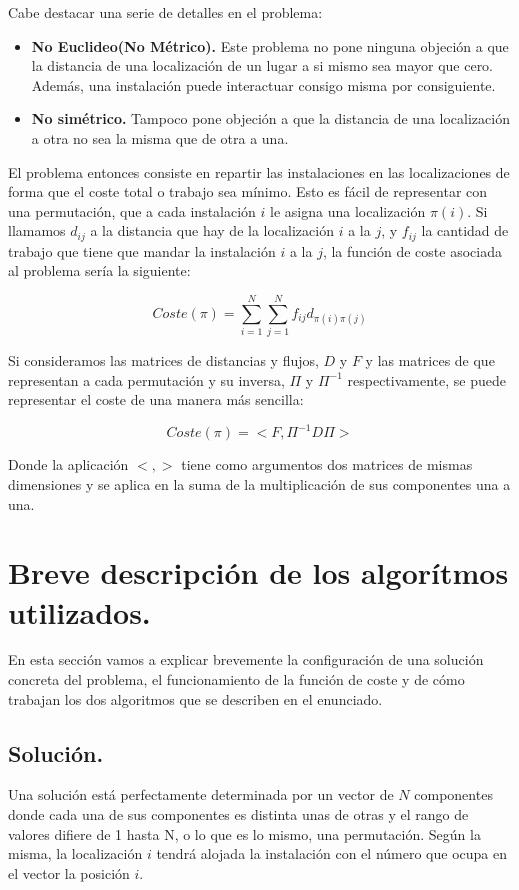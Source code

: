 Cabe destacar una serie de detalles en el problema:

\begin{itemize}
	\item \textbf{No Euclideo(No Métrico).} Este problema  no pone ninguna objeción a que la distancia de una localización de un lugar a si mismo sea mayor que cero. Además, una instalación puede interactuar consigo misma por consiguiente.
	\item \textbf{No simétrico.} Tampoco pone objeción a que la distancia de una localización a otra no sea la misma que de otra a una.
\end{itemize}

El problema entonces consiste en repartir las instalaciones en las localizaciones de forma que el coste total o trabajo sea mínimo. Esto es fácil de representar con una permutación, que a cada instalación $i$ le asigna una localización $\pi(i)$. Si llamamos $d_{ij}$ a la distancia que hay de la localización $i$ a la $j$, y $f_{ij}$ la cantidad de trabajo que tiene que mandar la instalación $i$ a la $j$, la función de coste asociada al problema sería la siguiente:

\[Coste(\pi)=\sum_{i=1}^{N}\sum_{j=1}^{N}f_{ij}d_{\pi(i)\pi(j)}\]

Si consideramos las matrices de distancias y flujos, $D$ y $F$ y las matrices de que representan a cada permutación y su inversa, $\Pi$ y $\Pi^{-1}$ respectivamente, se puede representar el coste de una manera más sencilla:

\[Coste(\pi)=<F,\Pi^{-1}D\Pi> \]

Donde la aplicación $<,>$ tiene como argumentos dos matrices de mismas dimensiones y se aplica en la suma de la multiplicación de sus componentes una a una. 

\newpage

\section{Breve descripción de los algorítmos utilizados.}
En esta sección vamos a explicar brevemente la configuración de una solución concreta del problema, el funcionamiento de la función de coste y de cómo trabajan los dos algoritmos que se describen en el enunciado.

\subsection{Solución.}

Una solución está perfectamente determinada por un vector de $N$ componentes donde cada una de sus componentes es distinta unas de otras y el rango de valores difiere de 1 hasta N, o lo que es lo mismo, una permutación. Según la misma, la localización $i$ tendrá alojada la instalación con el número que ocupa en el vector la posición $i$.

